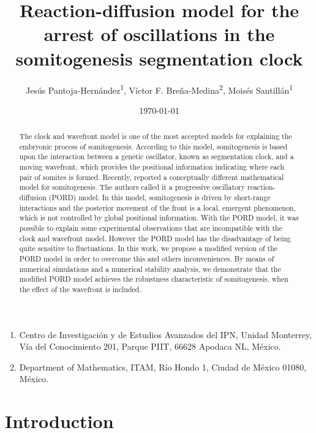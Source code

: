 \documentclass[11pt]{article}
\title{Reaction-diffusion model for the arrest of oscillations in the
	somitogenesis segmentation clock}
\author{Jes\'us Pantoja-Hern\'andez\textsuperscript{1}, V\'ictor F. Bre\~na-Medina\textsuperscript{2}, Mois\'es Santill\'an\textsuperscript{1}}
\date{\today}
\begin{document}
	\maketitle
	
	
\begin{enumerate}
\item Centro de Investigaci\'on y de Estudios Avanzados del IPN, Unidad Monterrey, Vía del Conocimiento 201, Parque PIIT, 66628 Apodaca NL, México.
\item Department of Mathematics, ITAM, Río Hondo 1, Ciudad de México 01080, México.
\end{enumerate}

	\begin{abstract}
	The clock and wavefront model is one of the most accepted models for explaining the embryonic process of somitogenesis. According to this model, somitogenesis is based upon the interaction between a genetic oscillator, known as segmentation clock, and a moving wavefront, which provides the positional information indicating where each pair of somites is formed. Recently, \citet{Cotterell2015} reported a conceptually different mathematical model for somitogenesis. The authors called it a progressive oscillatory reaction-diffusion (PORD) model. In this model, somitogenesis is driven by short-range interactions and the posterior movement of the front is a local, emergent phenomenon, which is not controlled by global positional information. With the PORD model, it was possible to explain some experimental observations that are incompatible with the clock and wavefront model. However the PORD model has the disadvantage of being quite sensitive to fluctuations. In this work, we propose a modified version of the PORD model in order to overcome this and others inconveniences. By means of numerical simulations and a numerical stability analysis, we demonstrate that the modified PORD model achieves the robustness characteristic of somitogenesis, when the effect of the wavefront is included.
	\end{abstract}
	
	\section{Introduction}
	\label{intro}
	
\end{document}
